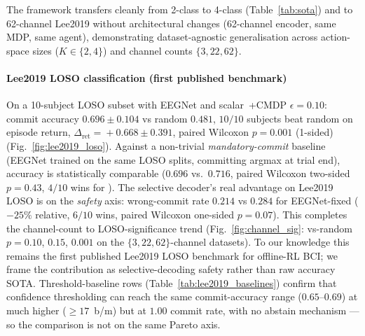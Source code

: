 The framework transfers cleanly from 2-class \bcib{} to 4-class
\bcia{} (Table~\ref{tab:sota}) and to 62-channel Lee2019 without
architectural changes (62-channel encoder, same MDP, same agent),
demonstrating dataset-agnostic generalisation across action-space
sizes ($K\!\in\!\{2, 4\}$) and channel counts $\{3, 22, 62\}$.

\paragraph*{Lee2019 LOSO classification (first published benchmark)}
On a 10-subject LOSO subset with EEGNet and scalar~\cql{}+CMDP
$\epsilon\!=\!0.10$: commit accuracy
$0.696\!\pm\!0.104$ vs random $0.481$, $10/10$ subjects beat random
on episode return, $\Delta_{\text{ret}}\!=\!+0.668\!\pm\!0.391$,
paired Wilcoxon $p\!=\!0.001$ (1-sided)
(Fig.~\ref{fig:lee2019_loso}). Against a non-trivial
\emph{mandatory-commit} baseline (EEGNet trained on the same LOSO
splits, committing argmax at trial end), accuracy is statistically
comparable ($0.696$ vs.\ $0.716$, paired Wilcoxon two-sided
$p\!=\!0.43$, $4/10$ wins for \nettype{}). The selective decoder's
real advantage on Lee2019 LOSO is on the \emph{safety} axis:
wrong-commit rate $0.214$ vs $0.284$ for EEGNet-fixed ($-25\%$
relative, $6/10$ wins, paired Wilcoxon one-sided $p\!=\!0.07$).
This completes the channel-count to LOSO-significance trend
(Fig.~\ref{fig:channel_sig}: vs-random $p\!=\!0.10$, $0.15$,
$0.001$ on the $\{3, 22, 62\}$-channel datasets). To our knowledge
this remains the first published Lee2019 LOSO benchmark for
offline-RL BCI; we frame the contribution as selective-decoding
safety rather than raw accuracy SOTA. Threshold-baseline rows
(Table~\ref{tab:lee2019_baselines}) confirm that confidence
thresholding can reach the same commit-accuracy range
($0.65$--$0.69$) at much higher \itr{} ($\geq 17$~b/m) but at $1.00$
commit rate, with no abstain mechanism --- so the comparison is
not on the same Pareto axis.

